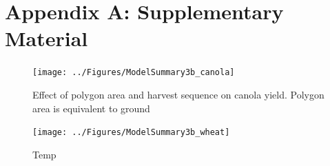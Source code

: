 \documentclass[]{elsarticle} %
\begin{document}
\newpage

\hypertarget{appendix-a-supplementary-material}{%
\section*{Appendix A: Supplementary Material}\label{appendix-a-supplementary-material}}

\begin{figure}
\texttt{[image: ../Figures/ModelSummary3b\_canola]} \caption{Effect of polygon area and harvest sequence on canola yield. Polygon area is equivalent to ground }\label{fig:unnamed-chunk-2}
\end{figure}

\begin{figure}
\texttt{[image: ../Figures/ModelSummary3b\_wheat]} \caption{Temp}\label{fig:unnamed-chunk-3}
\end{figure}
\end{document}
